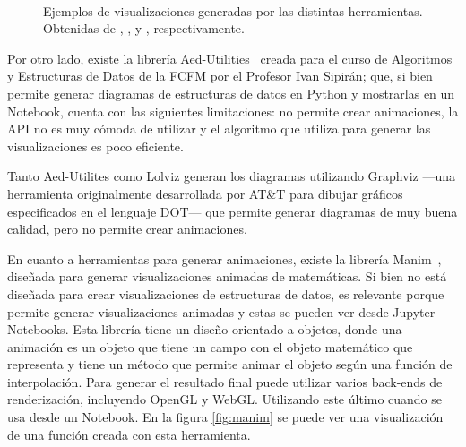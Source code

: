 \begin{figure}[h!]
{        \label{fig:lolviz}
    }\\
    \caption[Ejemplos de las distintas herramientas.]{Ejemplos de visualizaciones generadas por las distintas herramientas. Obtenidas de \cite{Stanch2021}, \cite{Lolviz}, \cite{aed-utilities} y \cite{manim}, respectivamente.}
    \label{fig:comparacion}
\end{figure}

Por otro lado, existe la librería Aed-Utilities~\cite{aed-utilities} creada para el curso de Algoritmos y Estructuras de Datos de la FCFM por el Profesor Ivan Sipirán; que, si bien permite generar diagramas de estructuras de datos en Python y mostrarlas en un Notebook, cuenta con las siguientes limitaciones: no permite crear animaciones, la API no es muy cómoda de utilizar y el algoritmo que utiliza para generar las visualizaciones es poco eficiente. %

Tanto Aed-Utilites como Lolviz generan los diagramas utilizando Graphviz ---una herramienta originalmente desarrollada por AT\&T para dibujar gráficos especificados en el lenguaje DOT--- que permite generar diagramas de muy buena calidad, pero no permite crear animaciones.

En cuanto a herramientas para generar animaciones, existe la librería Manim~\cite{manim}, diseñada para generar visualizaciones animadas de matemáticas. Si bien no está diseñada para crear visualizaciones de estructuras de datos, es relevante porque permite generar visualizaciones animadas y estas se pueden ver desde Jupyter Notebooks. Esta librería tiene un diseño orientado a objetos, donde una animación es un objeto que tiene un campo con el objeto matemático que representa y tiene un método que permite animar el objeto según una función de interpolación. Para generar el resultado final puede utilizar varios back-ends de renderización, incluyendo OpenGL y WebGL. Utilizando este último cuando se usa desde un Notebook. En la figura \ref{fig:manim} se puede ver una visualización de una función creada con esta herramienta.

